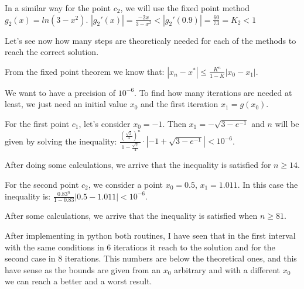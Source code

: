 \documentclass[12pt,letterpaper]{article}
\theoremstyle{definition}
\begin{document}
    In a similar way for the point $c_2$, we will use the fixed point method $g_2(x) = ln(3-x^2)$. 
$|g_2'(x)| = \frac{-2x}{3-x^2} < |g_2'(0.9)| = \frac{60}{73} = K_2 < 1$

\vspace{0.5cm}

Let's see now how many steps are theoreticaly needed for each of the methods  to reach the correct solution. 

From the fixed point theorem we know that:
$|x_n - x^{*}| \le \frac{K^n}{1-K} |x_0 - x_1|$.

We want to have a precision of $10^{-6}$. To find how many iterations are needed at least, we just need an initial value $x_0$ and the first iteration $x_1 =g(x_0)$.

For the first point $c_1$, let's consider $x_0 = -1$. Then $x_1 = -\sqrt{3- e^{-1}}$ and $n$ will be given by solving the inequality:
$\frac{\left( \frac{\sqrt{2}}{4}\right)^n}{1-\frac{\sqrt{2}}{4}} \cdot |-1 + \sqrt{3-e^{-1}}| < 10^{-6}$.

After doing some calculations, we arrive that the inequality is satisfied for $n \ge 14$. 

For the second point $c_2$, we consider a point $x_0 =0.5$, $x_1 = 1.011$. In this case the inequality is: $\frac{0.83^n}{1-0.83} |0.5 - 1.011| < 10^{-6}$.

After some calculations, we arrive that the inequality is satisfied when $n\ge 81$. 
\vspace{0.5cm}

After implementing in python both routines, I have seen that in the first interval with the same conditions in 6 iterations it reach to the solution and for the second case in 8 iterations. 
This numbers are below the theoretical ones, and this have sense as the bounds are given from an $x_0$ arbitrary and with a different $x_0$ we can reach a better and a worst result.
\end{document}
